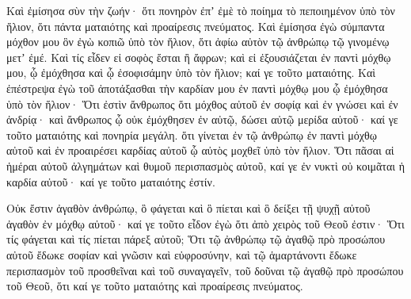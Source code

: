 {\par }{\PP {}Καὶ ἐμίσησα σὺν τὴν ζωήν· ὅτι πονηρὸν ἐπʼ ἐμὲ τὸ ποίημα τὸ πεποιημένον ὑπὸ τὸν ἥλιον, ὅτι πάντα ματαιότης καὶ προαίρεσις πνεύματος.
Καὶ ἐμίσησα ἐγὼ σύμπαντα μόχθον μου ὃν ἐγὼ κοπιῶ ὑπὸ τὸν ἥλιον, ὅτι ἀφίω αὐτὸν τῷ ἀνθρώπῳ τῷ γινομένῳ μετʼ ἐμέ.
Καὶ τίς εἶδεν εἰ σοφὸς ἔσται ἢ ἄφρων; καὶ εἰ ἐξουσιάζεται ἐν παντὶ μόχθῳ μου, ᾧ ἐμόχθησα καὶ ᾧ ἐσοφισάμην ὑπὸ τὸν ἥλιον; καί γε τοῦτο ματαιότης.
Καὶ ἐπέστρεψα ἐγὼ τοῦ ἀποτάξασθαι τὴν καρδίαν μου ἐν παντὶ μόχθῳ μου ᾧ ἐμόχθησα ὑπὸ τὸν ἥλιον·
Ὅτι ἐστὶν ἄνθρωπος ὅτι μόχθος αὐτοῦ ἐν σοφίᾳ καὶ ἐν γνώσει καὶ ἐν ἀνδρίᾳ· καὶ ἄνθρωπος ᾧ οὐκ ἐμόχθησεν ἐν αὐτῷ, δώσει αὐτῷ μερίδα αὐτοῦ· καί γε τοῦτο ματαιότης καὶ πονηρία μεγάλη.
ὅτι γίνεται ἐν τῷ ἀνθρώπῳ ἐν παντὶ μόχθῳ αὐτοῦ καὶ ἐν προαιρέσει καρδίας αὐτοῦ ᾧ αὐτὸς μοχθεῖ ὑπὸ τὸν ἥλιον.
Ὅτι πᾶσαι αἱ ἡμέραι αὐτοῦ ἀλγημάτων καὶ θυμοῦ περισπασμὸς αὐτοῦ, καί γε ἐν νυκτὶ οὐ κοιμᾶται ἡ καρδία αὐτοῦ· καί γε τοῦτο ματαιότης ἐστίν.
\par }{\PP {}Οὐκ ἔστιν ἀγαθὸν ἀνθρώπῳ, ὃ φάγεται καὶ ὃ πίεται καὶ ὃ δείξει τῇ ψυχῇ αὐτοῦ ἀγαθὸν ἐν μόχθῳ αὐτοῦ· καί γε τοῦτο εἶδον ἐγὼ ὅτι ἀπὸ χειρὸς τοῦ Θεοῦ ἐστιν·
Ὅτι τίς φάγεται καὶ τίς πίεται πάρεξ αὐτοῦ;
Ὅτι τῷ ἀνθρώπῳ τῷ ἀγαθῷ πρὸ προσώπου αὐτοῦ ἔδωκε σοφίαν καὶ γνῶσιν καὶ εὐφροσύνην, καὶ τῷ ἁμαρτάνοντι ἔδωκε περισπασμὸν τοῦ προσθεῖναι καὶ τοῦ συναγαγεῖν, τοῦ δοῦναι τῷ ἀγαθῷ πρὸ προσώπου τοῦ Θεοῦ, ὅτι καί γε τοῦτο ματαιότης καὶ προαίρεσις πνεύματος.

}
